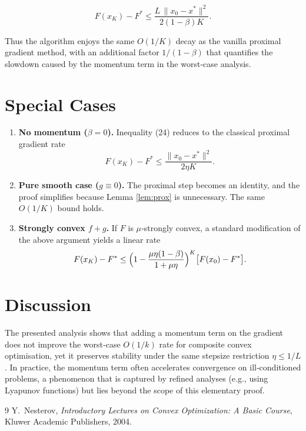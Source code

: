 \documentclass{article}
\begin{document}
\[
F(x_{K})-F^{*}\le
\frac{L\,\|x_{0}-x^{*}\|^{2}}{2(1-\beta)K}.
\]

Thus the algorithm enjoys the same $O(1/K)$ decay as the vanilla proximal gradient method, with an additional factor $1/(1-\beta)$ that quantifies the slowdown caused by the momentum term in the worst‑case analysis.

\section*{Special Cases}
\begin{enumerate}[label=\alph*.]
\item \textbf{No momentum ($\beta=0$).} Inequality (24) reduces to the classical proximal gradient rate  
\[
F(x_{K})-F^{*}\le\frac{\|x_{0}-x^{*}\|^{2}}{2\eta K}.
\]

\item \textbf{Pure smooth case ($g\equiv0$).} The proximal step becomes an identity, and the proof simplifies because Lemma \ref{lem:prox} is unnecessary. The same $O(1/K)$ bound holds.

\item \textbf{Strongly convex $f+g$.} If $F$ is $\mu$‑strongly convex, a standard modification of the above argument yields a linear rate  
\[
F(x_{K})-F^{*}\le\Bigl(1-\frac{\mu\eta(1-\beta)}{1+\mu\eta}\Bigr)^{K}\bigl[F(x_{0})-F^{*}\bigr].
\]
\end{enumerate}

\section*{Discussion}
The presented analysis shows that adding a momentum term on the gradient does not improve the worst‑case $O(1/k)$ rate for composite convex optimisation, yet it preserves stability under the same stepsize restriction $\eta\le1/L$. In practice, the momentum term often accelerates convergence on ill‑conditioned problems, a phenomenon that is captured by refined analyses (e.g., using Lyapunov functions) but lies beyond the scope of this elementary proof.

\begin{thebibliography}{9}
Y.~Nesterov, \emph{Introductory Lectures on Convex Optimization: A Basic Course}, Kluwer Academic Publishers, 2004.
\end{thebibliography}
\end{document}
